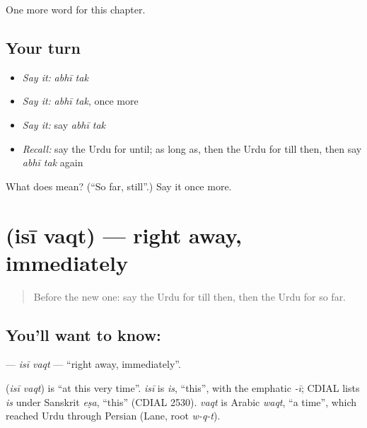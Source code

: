 \begin{grammarlens}[title={What you've built}]
One more word for this chapter.
\end{grammarlens}

\subsection*{Your turn}
\begin{itemize}
\raggedright
  \item \emph{Say it:} \emph{abhī tak}
  \item \emph{Say it:} \emph{abhī tak}, once more
  \item \emph{Say it:} say \emph{abhī tak}
  \item \emph{Recall:} say the Urdu for until; as long as, then the Urdu for till then, then say \emph{abhī tak} again
\end{itemize}

\begin{tcolorbox}[breakable,colback=teal!4,colframe=teal!35!black,title={Before you move on}]
What does   mean? (\textquotedblleft{}So far, still\textquotedblright{}.) Say it once more.
\end{tcolorbox}
\section[\texorpdfstring{\ur{اسی} \ur{وقت} (isī vaqt)}{اسی وقت (isī vaqt)}]{  (isī vaqt) — right away, immediately}

\label{lesson:UR-C189-isi-vaqt}



\begin{quote}
Before the new one: say the Urdu for till then, then the Urdu for so far.
\end{quote}

\subsection*{You'll want to know:  }
\textbf{ } — \emph{isī vaqt} — \textquotedblleft{}right away, immediately\textquotedblright{}.

\begin{cousinweb}
\textbf{ } (\emph{isī vaqt}) is \textquotedblleft{}at this very time\textquotedblright{}. \emph{isī} is \emph{is}, \textquotedblleft{}this\textquotedblright{}, with the emphatic \emph{-ī}; CDIAL lists \emph{is} under Sanskrit \emph{eṣa}, \textquotedblleft{}this\textquotedblright{} (CDIAL 2530). \emph{vaqt} is Arabic \emph{waqt}, \textquotedblleft{}a time\textquotedblright{}, which reached Urdu through Persian (Lane, root \emph{w-q-t}).
\end{cousinweb}

